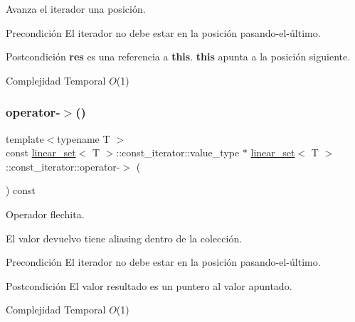 Avanza el iterador una posición. 

\begin{DoxyPrecond}{Precondición}
El iterador no debe estar en la posición pasando-\/el-\/último. 
\end{DoxyPrecond}
\begin{DoxyPostcond}{Postcondición}
{\bfseries res} es una referencia a {\bfseries this}. {\bfseries this} apunta a la posición siguiente.
\end{DoxyPostcond}

\begin{DoxyDescription}
\item[Complejidad Temporal]$O$(1)
\end{DoxyDescription}\mbox{\label{classlinear__set_1_1const__iterator_a030faa9ebc44c349c0eb59346d3d998e}} 
\subsubsection{\texorpdfstring{operator-\/$>$()}{operator->()}}
{\footnotesize\ttfamily template$<$typename T $>$ \\
const \mbox{\hyperlink{classlinear__set}{linear\+\_\+set}}$<$ T $>$\+::const\+\_\+iterator\+::value\+\_\+type $\ast$ \mbox{\hyperlink{classlinear__set}{linear\+\_\+set}}$<$ T $>$\+::const\+\_\+iterator\+::operator-\/$>$ (\begin{DoxyParamCaption}{ }\end{DoxyParamCaption}) const}



Operador flechita. 

El valor devuelvo tiene aliasing dentro de la colección.

\begin{DoxyPrecond}{Precondición}
El iterador no debe estar en la posición pasando-\/el-\/último. 
\end{DoxyPrecond}
\begin{DoxyPostcond}{Postcondición}
El valor resultado es un puntero al valor apuntado.
\end{DoxyPostcond}

\begin{DoxyDescription}
\item[Complejidad Temporal]$O$(1)
\end{DoxyDescription}\mbox{\label{classlinear__set_1_1const__iterator_a4ddac553888382c5d60372e721f29249}} 
